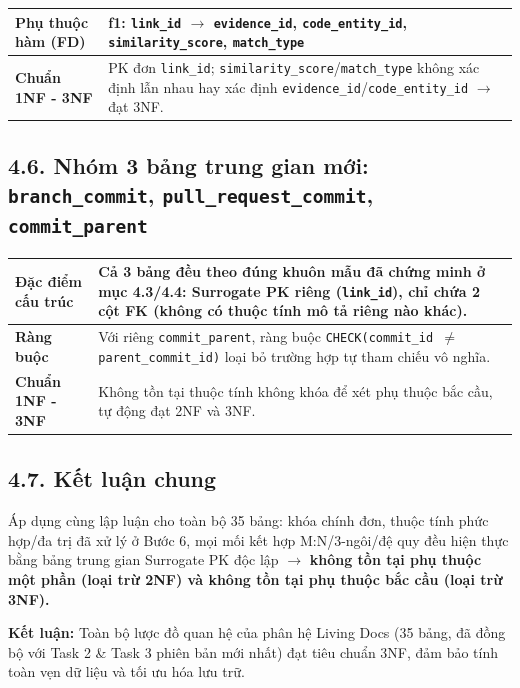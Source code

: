 \noindent
\begin{tabularx}{\textwidth}{@{} >{\bfseries}p{3.5cm} X @{}}
\hline
Phụ thuộc hàm (FD) & 
\textbf{f1:} \texttt{link\_id} $\rightarrow$ \texttt{evidence\_id}, \texttt{code\_entity\_id}, \texttt{similarity\_score}, \texttt{match\_type} \\
\hline
Chuẩn 1NF - 3NF & PK đơn \texttt{link\_id}; \texttt{similarity\_score}/\texttt{match\_type} không xác định lẫn nhau hay xác định \texttt{evidence\_id}/\texttt{code\_entity\_id} $\rightarrow$ đạt 3NF. \\
\hline
\end{tabularx}

\vspace{0.5cm}

\subsection*{4.6. Nhóm 3 bảng trung gian mới: \texttt{branch\_commit}, \texttt{pull\_request\_commit}, \texttt{commit\_parent}}

\noindent
\begin{tabularx}{\textwidth}{@{} >{\bfseries}p{3.5cm} X @{}}
\hline
Đặc điểm cấu trúc & 
Cả 3 bảng đều theo đúng khuôn mẫu đã chứng minh ở mục 4.3/4.4: Surrogate PK riêng (\texttt{link\_id}), chỉ chứa 2 cột FK (không có thuộc tính mô tả riêng nào khác). \\
\hline
Ràng buộc & Với riêng \texttt{commit\_parent}, ràng buộc \texttt{CHECK(commit\_id $\neq$ parent\_commit\_id)} loại bỏ trường hợp tự tham chiếu vô nghĩa. \\
\hline
Chuẩn 1NF - 3NF & Không tồn tại thuộc tính không khóa để xét phụ thuộc bắc cầu, tự động đạt 2NF và 3NF. \\
\hline
\end{tabularx}

\vspace{0.8cm}

\subsection*{4.7. Kết luận chung}

Áp dụng cùng lập luận cho toàn bộ 35 bảng: khóa chính đơn, thuộc tính phức hợp/đa trị đã xử lý ở Bước 6, mọi mối kết hợp M:N/3-ngôi/đệ quy đều hiện thực bằng bảng trung gian Surrogate PK độc lập $\rightarrow$ \textbf{không tồn tại phụ thuộc một phần (loại trừ 2NF) và không tồn tại phụ thuộc bắc cầu (loại trừ 3NF).}

\vspace{0.3cm}
\noindent\textbf{Kết luận:} Toàn bộ lược đồ quan hệ của phân hệ Living Docs (35 bảng, đã đồng bộ với Task 2 \& Task 3 phiên bản mới nhất) đạt tiêu chuẩn 3NF, đảm bảo tính toàn vẹn dữ liệu và tối ưu hóa lưu trữ.



